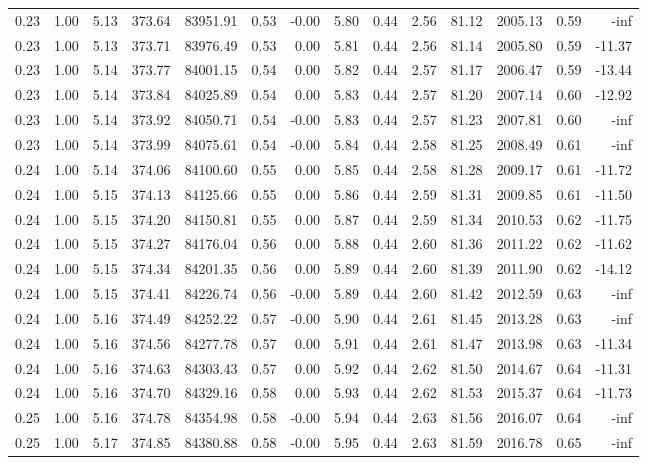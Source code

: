 \begin{table}[!ht]
\begin{tabular}{rrrrrrrrrrrrrr}
0.23 & 1.00 & 5.13 & 373.64 & 83951.91 & 0.53 & -0.00 & 5.80 & 0.44 & 2.56 & 81.12 & 2005.13 & 0.59 & -inf \\
0.23 & 1.00 & 5.13 & 373.71 & 83976.49 & 0.53 & 0.00 & 5.81 & 0.44 & 2.56 & 81.14 & 2005.80 & 0.59 & -11.37 \\
0.23 & 1.00 & 5.14 & 373.77 & 84001.15 & 0.54 & 0.00 & 5.82 & 0.44 & 2.57 & 81.17 & 2006.47 & 0.59 & -13.44 \\
0.23 & 1.00 & 5.14 & 373.84 & 84025.89 & 0.54 & 0.00 & 5.83 & 0.44 & 2.57 & 81.20 & 2007.14 & 0.60 & -12.92 \\
0.23 & 1.00 & 5.14 & 373.92 & 84050.71 & 0.54 & -0.00 & 5.83 & 0.44 & 2.57 & 81.23 & 2007.81 & 0.60 & -inf \\
0.23 & 1.00 & 5.14 & 373.99 & 84075.61 & 0.54 & -0.00 & 5.84 & 0.44 & 2.58 & 81.25 & 2008.49 & 0.61 & -inf \\
0.24 & 1.00 & 5.14 & 374.06 & 84100.60 & 0.55 & 0.00 & 5.85 & 0.44 & 2.58 & 81.28 & 2009.17 & 0.61 & -11.72 \\
0.24 & 1.00 & 5.15 & 374.13 & 84125.66 & 0.55 & 0.00 & 5.86 & 0.44 & 2.59 & 81.31 & 2009.85 & 0.61 & -11.50 \\
0.24 & 1.00 & 5.15 & 374.20 & 84150.81 & 0.55 & 0.00 & 5.87 & 0.44 & 2.59 & 81.34 & 2010.53 & 0.62 & -11.75 \\
0.24 & 1.00 & 5.15 & 374.27 & 84176.04 & 0.56 & 0.00 & 5.88 & 0.44 & 2.60 & 81.36 & 2011.22 & 0.62 & -11.62 \\
0.24 & 1.00 & 5.15 & 374.34 & 84201.35 & 0.56 & 0.00 & 5.89 & 0.44 & 2.60 & 81.39 & 2011.90 & 0.62 & -14.12 \\
0.24 & 1.00 & 5.15 & 374.41 & 84226.74 & 0.56 & -0.00 & 5.89 & 0.44 & 2.60 & 81.42 & 2012.59 & 0.63 & -inf \\
0.24 & 1.00 & 5.16 & 374.49 & 84252.22 & 0.57 & -0.00 & 5.90 & 0.44 & 2.61 & 81.45 & 2013.28 & 0.63 & -inf \\
0.24 & 1.00 & 5.16 & 374.56 & 84277.78 & 0.57 & 0.00 & 5.91 & 0.44 & 2.61 & 81.47 & 2013.98 & 0.63 & -11.34 \\
0.24 & 1.00 & 5.16 & 374.63 & 84303.43 & 0.57 & 0.00 & 5.92 & 0.44 & 2.62 & 81.50 & 2014.67 & 0.64 & -11.31 \\
0.24 & 1.00 & 5.16 & 374.70 & 84329.16 & 0.58 & 0.00 & 5.93 & 0.44 & 2.62 & 81.53 & 2015.37 & 0.64 & -11.73 \\
0.25 & 1.00 & 5.16 & 374.78 & 84354.98 & 0.58 & -0.00 & 5.94 & 0.44 & 2.63 & 81.56 & 2016.07 & 0.64 & -inf \\
0.25 & 1.00 & 5.17 & 374.85 & 84380.88 & 0.58 & -0.00 & 5.95 & 0.44 & 2.63 & 81.59 & 2016.78 & 0.65 & -inf \\

\end{tabular}
\end{table}
